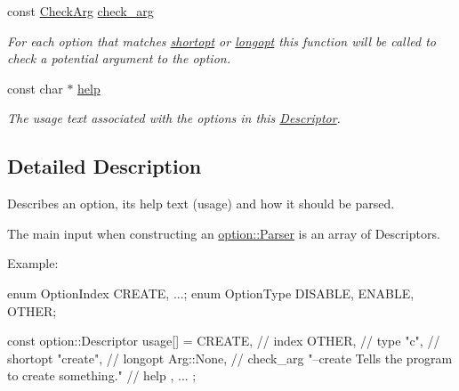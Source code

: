 \begin{DoxyCompactItemize}
const \hyperlink{namespaceoption_a4afb7f04597f34439679509baf4b6d39}{\-Check\-Arg} \hyperlink{structoption_1_1_descriptor_aa5d675dba0214a4abd73007ff163cc67}{check\-\_\-arg}
\begin{DoxyCompactList}\small\item\em \-For each option that matches \hyperlink{structoption_1_1_descriptor_a0dba4ccca59c19d6ed4081391fca5adb}{shortopt} or \hyperlink{structoption_1_1_descriptor_a470c449dfa894c9bfda2dae026142b4b}{longopt} this function will be called to check a potential argument to the option. \end{DoxyCompactList}\item 
const char $\ast$ \hyperlink{structoption_1_1_descriptor_a9045b19311533e1b8a08645d57149c79}{help}
\begin{DoxyCompactList}\small\item\em \-The usage text associated with the options in this \hyperlink{structoption_1_1_descriptor}{\-Descriptor}. \end{DoxyCompactList}\end{DoxyCompactItemize}


\subsection{\-Detailed \-Description}
\-Describes an option, its help text (usage) and how it should be parsed. 

\-The main input when constructing an \hyperlink{classoption_1_1_parser}{option\-::\-Parser} is an array of \-Descriptors.

\begin{DoxyParagraph}{\-Example\-:}

\begin{DoxyCode}
 enum OptionIndex {CREATE, ...};
 enum OptionType {DISABLE, ENABLE, OTHER};

 const option::Descriptor usage[] = {
   { CREATE,                                            // index
     OTHER,                                             // type
     "c",                                               // shortopt
     "create",                                          // longopt
     Arg::None,                                         // check_arg
     "--create  Tells the program to create something." // help
   }
   , ...
 };
\end{DoxyCode}
 
\end{DoxyParagraph}


